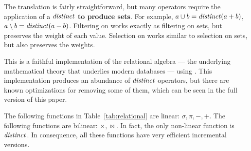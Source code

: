 The translation is fairly straightforward, but many operators require
the application of a $\mathit{distinct}$ \textbf{to produce sets}.  For
example, $a \cup b = \mathit{distinct}(a + b)$, $a \setminus b = \mathit{distinct}(a -
b)$.  Filtering on \zrs works exactly as filtering on sets, but
preserves the weight of each value.  Selection on \zrs works similar
to selection on sets, but also preserves the weights.

%
%
%
%
%
%

This is a faithful implementation of the relational algebra --- the
underlying mathematical theory that underlies modern databases ---
using \zrs.  This implementation produces an abundance of $\mathit{distinct}$
operators, but there are known optimizations for removing some of
them, which can be seen in the full version of this paper.

The following functions in Table~\ref{tab:relational} are linear:
$\sigma, \pi, -, +$.  The following functions are bilinear: $\times,
\bowtie$.  In fact, the only non-linear function is $\mathit{distinct}$.  In
consequence, all these functions have very efficient incremental
versions.

